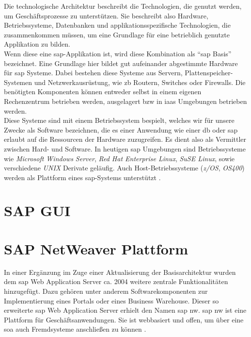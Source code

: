 Die technologische Architektur beschreibt die Technologien, die genutzt werden, um Geschäftsprozesse zu unterstützen. Sie beschreibt also Hardware, Betriebssysteme, Datenbanken und applikationsspezifische Technologien, die zusammenkommen müssen, um eine Grundlage für eine betrieblich genutzte Applikation zu bilden.\\
Wenn diese eine \gls{sap}-Applikation ist, wird diese Kombination als "`\gls{sap} Basis"' bezeichnet.
Eine Grundlage hier bildet gut aufeinander abgestimmte Hardware für \gls{sap} Systeme. Dabei bestehen diese Systeme aus Servern, Plattenspeicher-Systemen und Netzwerkausrüstung, wie \gls{zb} Routern, Switches oder Firewalls. Die benötigten Komponenten können entweder selbst in einem eigenen Rechenzentrum betrieben werden, ausgelagert \gls{bzw} in \gls{iaas} Umgebungen betrieben werden.\\
Diese Systeme sind mit einem Betriebssystem bespielt, welches wir für unsere Zwecke als Software bezeichnen, die es einer Anwendung wie einer \gls{db} oder \gls{sap} erlaubt auf die Ressourcen der Hardware zuzugreifen. Es dient also als Vermittler zwischen Hard- und Software.
In heutigen \gls{sap} Umgebungen sind Betriebssysteme wie \emph{Microsoft Windows Server}, \emph{Red Hat Enterprise Linux}, \emph{SuSE Linux}, sowie verschiedene \emph{UNIX} Derivate geläufig. Auch Host-Betriebssysteme (\emph{z/OS}, \emph{OS400}) werden als Plattform eines \gls{sap}-Systems unterstützt \cite{SAPin24hrs}. 

\section{SAP GUI}
\label{sec:sapgui}

\section{SAP NetWeaver Plattform}
\label{sec:netweaver}
In einer Ergänzung im Zuge einer Aktualisierung der Basisarchitektur wurden dem \gls{sap} Web Application Server ca. 2004 weitere zentrale Funktionalitäten hinzugefügt. Dazu gehören unter anderem Softwarekomponenten zur Implementierung eines Portals oder eines Business Warehouse. Dieser so erweiterte \gls{sap} Web Application Server erhielt den Namen \gls{sap} \gls{nw}. \gls{sap} \gls{nw} ist eine Plattform für Geschäftsanwendungen. Sie ist webbasiert und offen, um über eine \gls{soa} auch Fremdsysteme anschließen zu können \cite{saptec}.

